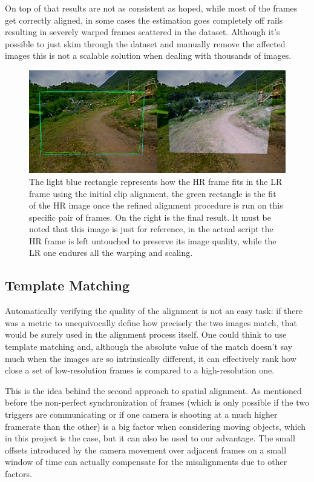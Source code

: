 On top of that results are not as consistent as hoped, while most of the frames get correctly aligned, in some cases the estimation goes completely off rails resulting in severely warped frames scattered in the dataset. Although it's possible to just skim through the dataset and manually remove the affected images this is not a scalable solution when dealing with thousands of images.

\begin{figure}[H]
  \centering
  \includegraphics[width=1\textwidth]{figures/deep_match_sbs.png}
  \caption{The light blue rectangle represents how the HR frame fits in the LR frame using the initial clip alignment, the green rectangle is the fit of the HR image once the refined alignment procedure is run on this specific pair of frames. On the right is the final result. It must be noted that this image is just for reference, in the actual script the HR frame is left untouched to preserve its image quality, while the LR one endures all the warping and scaling.}
  \label{img:deep_match}
\end{figure}

\subsection {Template Matching}
\label{subsec:template_match}

Automatically verifying the quality of the alignment is not an easy task: if there was a metric to unequivocally define how precisely the two images match, that would be surely used in the alignment process itself. One could think to use template matching and, although the absolute value of the match doesn't say much when the images are so intrinsically different, it can effectively rank how close a set of low-resolution frames is compared to a high-resolution one.

This is the idea behind the second approach to spatial alignment. As mentioned before the non-perfect synchronization of frames (which is only possible if the two triggers are communicating or if one camera is shooting at a much higher framerate than the other) is a big factor when considering moving objects, which in this project is the case, but it can also be used to our advantage. The small offsets introduced by the camera movement over adjacent frames on a small window of time can actually compensate for the misalignments due to other factors.


